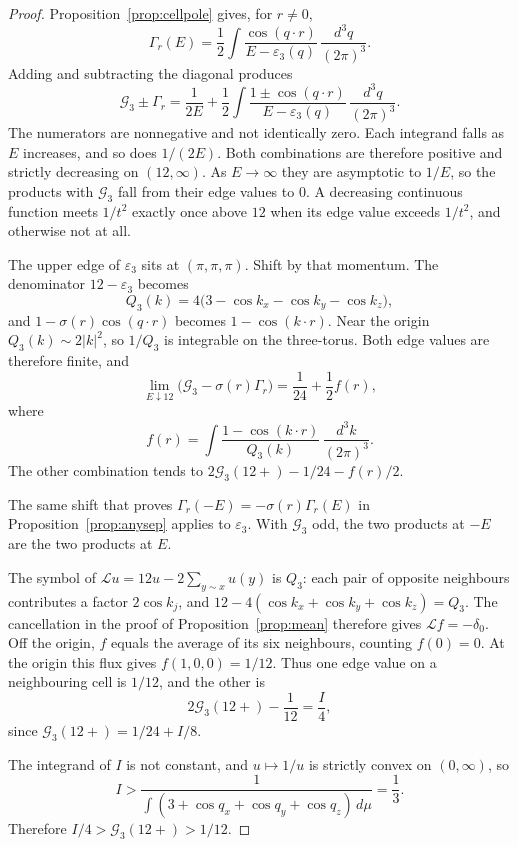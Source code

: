 \begin{proof}
Proposition~\ref{prop:cellpole} gives, for \(r\neq 0\),
\[
\Gamma_r(E)
=\frac12\int\frac{\cos(q\cdot r)}{E-\varepsilon_3(q)}\,\frac{d^3q}{(2\pi)^3}.
\]
Adding and subtracting the diagonal produces
\[
\mathcal{G}_3\pm\Gamma_r
=\frac{1}{2E}
+\frac12\int\frac{1\pm\cos(q\cdot r)}{E-\varepsilon_3(q)}\,\frac{d^3q}{(2\pi)^3}.
\]
The numerators are nonnegative and not identically zero.
Each integrand falls as \(E\) increases, and so does \(1/(2E)\).
Both combinations are therefore positive and strictly decreasing on
\((12,\infty)\).
As \(E\to\infty\) they are asymptotic to \(1/E\), so the products with
\(\mathcal{G}_3\) fall from their edge values to \(0\).
A decreasing continuous function meets \(1/t^2\) exactly once above \(12\)
when its edge value exceeds \(1/t^2\), and otherwise not at all.

The upper edge of \(\varepsilon_3\) sits at \((\pi,\pi,\pi)\).
Shift by that momentum.
The denominator \(12-\varepsilon_3\) becomes
\[
Q_3(k)=4\bigl(3-\cos k_x-\cos k_y-\cos k_z\bigr),
\]
and \(1-\sigma(r)\cos(q\cdot r)\) becomes \(1-\cos(k\cdot r)\).
Near the origin \(Q_3(k)\sim 2|k|^2\), so \(1/Q_3\) is integrable on the
three-torus.
Both edge values are therefore finite, and
\[
\lim_{E\downarrow 12}\bigl(\mathcal{G}_3-\sigma(r)\Gamma_r\bigr)
=\frac1{24}+\frac12 f(r),
\]
where
\[
f(r)
=\int\frac{1-\cos(k\cdot r)}{Q_3(k)}\,\frac{d^3k}{(2\pi)^3}.
\]
The other combination tends to \(2\mathcal{G}_3(12+)-1/24-f(r)/2\).

The same shift that proves \(\Gamma_r(-E)=-\sigma(r)\Gamma_r(E)\) in
Proposition~\ref{prop:anysep} applies to \(\varepsilon_3\).
With \(\mathcal{G}_3\) odd, the two products at \(-E\) are the two products
at \(E\).

The symbol of \(\mathcal{L}u=12u-2\sum_{y\sim x}u(y)\) is \(Q_3\):
each pair of opposite neighbours contributes a factor \(2\cos k_j\), and
\(12-4(\cos k_x+\cos k_y+\cos k_z)=Q_3\).
The cancellation in the proof of Proposition~\ref{prop:mean} therefore
gives \(\mathcal{L}f=-\delta_0\).
Off the origin, \(f\) equals the average of its six neighbours, counting
\(f(0)=0\).
At the origin this flux gives \(f(1,0,0)=1/12\).
Thus one edge value on a neighbouring cell is \(1/12\), and the other is
\[
2\mathcal{G}_3(12+)-\frac1{12}
=\frac I4,
\]
since \(\mathcal{G}_3(12+)=1/24+I/8\).

The integrand of \(I\) is not constant, and \(u\mapsto 1/u\) is strictly
convex on \((0,\infty)\), so
\[
I>\frac{1}{\int(3+\cos q_x+\cos q_y+\cos q_z)\,d\mu}=\frac13.
\]
Therefore \(I/4>\mathcal{G}_3(12+)>1/12\).


\end{proof}
